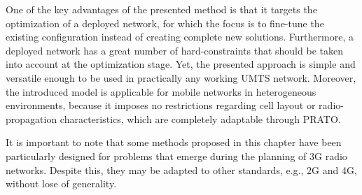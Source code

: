One of the key advantages of the presented method is that it targets
the optimization of a deployed network, for which the focus is to
fine-tune the existing configuration instead of creating complete
new solutions. Furthermore, a deployed network has a great number
of hard-constraints that should be taken into account at the optimization
stage. Yet, the presented approach is simple and versatile enough
to be used in practically any working UMTS network. Moreover, the
introduced model is applicable for mobile networks in heterogeneous
environments, because it imposes no restrictions regarding cell layout
or radio-propagation characteristics, which are completely adaptable
through PRATO.

It is important to note that some methods proposed in this chapter
have been particularly designed for problems that emerge during the
planning of 3G radio networks. Despite this, they may be adapted to
other standards, e.g., 2G and 4G, without lose of generality.
